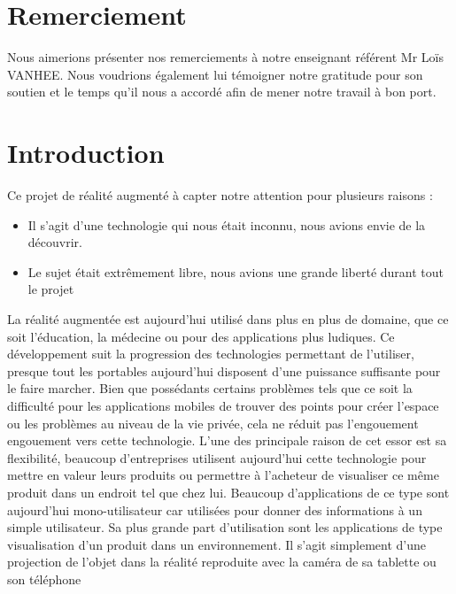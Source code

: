 \documentclass[12pt]{article}
\begin{document}
\newpage
\tableofcontents
\newpage









\section{Remerciement}

Nous aimerions présenter nos remerciements à notre enseignant référent Mr Loïs VANHEE.
Nous voudrions également lui témoigner notre gratitude pour son soutien et le
temps qu’il nous a accordé afin de mener notre travail à bon port. 
\newpage

\section{Introduction}
Ce projet de réalité augmenté à capter notre attention pour plusieurs raisons : 
\begin{itemize}
    \item Il s'agit d'une technologie qui nous était inconnu, nous avions envie de la découvrir.
    \item Le sujet était extrêmement libre, nous avions une grande liberté durant tout le projet
\end{itemize}

\medbreak
La réalité augmentée est aujourd'hui utilisé dans plus en plus de domaine, que ce soit l'éducation, la médecine ou pour des applications plus ludiques. Ce développement suit la progression des technologies permettant de l'utiliser, presque tout les portables aujourd'hui disposent d'une puissance suffisante pour le faire marcher. Bien que possédants certains problèmes tels que ce soit la difficulté pour les applications mobiles de trouver des points pour créer l'espace ou les problèmes au niveau de la vie privée, cela ne réduit pas l'engouement engouement vers cette technologie. L'une des principale raison de cet essor est sa flexibilité, beaucoup d'entreprises utilisent aujourd'hui cette technologie pour mettre en valeur leurs produits ou permettre à l'acheteur de visualiser ce même produit dans un endroit tel que chez lui.
\medbreak
Beaucoup d'applications de ce type sont aujourd'hui mono-utilisateur car utilisées pour donner des informations à un simple utilisateur. Sa plus grande part d'utilisation sont les applications de type visualisation d'un produit dans un environnement. Il s'agit simplement d'une projection de l'objet dans la réalité reproduite avec la caméra de sa tablette ou son téléphone
\end{document}

